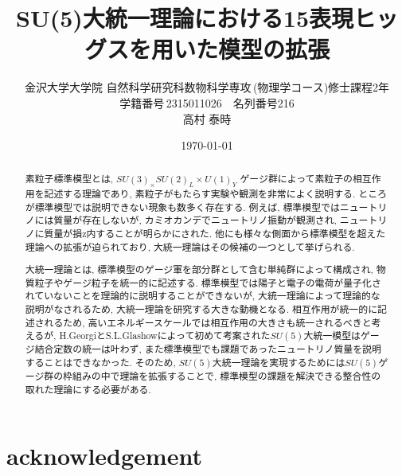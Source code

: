 \documentclass[uplatex,dvipdfmx,a4paper,titlepage,10pt]{jsreport}
\theoremstyle{plain}
\theoremstyle{definition}
\begin{document}
\title{SU(5)大統一理論における15表現ヒッグスを用いた模型の拡張}
\author{金沢大学大学院\,\,自然科学研究科数物科学専攻\,(物理学コース)修士課程2年\\学籍番号\,2315011026$\quad$名列番号216\\高村 泰時} 
\date{\today}
\maketitle

\tableofcontents
\clearpage

\chapter*{acknowledgement}

\begin{abstract}
  素粒子標準模型とは, $SU(3)_\times SU(2)_L\times U(1)_Y $ ゲージ群によって素粒子の相互作用を記述する理論であり, 素粒子がもたらす実験や観測を非常によく説明する.
  ところが標準模型では説明できない現象も数多く存在する.
  例えば, 標準模型ではニュートリノには質量が存在しないが, カミオカンデでニュートリノ振動が観測され, ニュートリノに質量が損z内することが明らかにされた.
  他にも様々な側面から標準模型を超えた理論への拡張が迫られており, 大統一理論はその候補の一つとして挙げられる.

  大統一理論とは, 標準模型のゲージ軍を部分群として含む単純群によって構成され, 物質粒子やゲージ粒子を統一的に記述する.
  標準模型では陽子と電子の電荷が量子化されていないことを理論的に説明することができないが, 大統一理論によって理論的な説明がなされるため, 大統一理論を研究する大きな動機となる.
  相互作用が統一的に記述されるため, 高いエネルギースケールでは相互作用の大きさも統一されるべきと考えるが, H.GeorgiとS.L.Glashowによって初めて考案された$SU(5)$大統一模型はゲージ結合定数の統一は叶わず, また標準模型でも課題であったニュートリノ質量を説明することはできなかった.
  そのため, $SU(5)$大統一理論を実現するためには$SU(5)$ゲージ群の枠組みの中で理論を拡張することで, 標準模型の課題を解決できる整合性の取れた理論にする必要がある.
\end{abstract}

\end{document}
